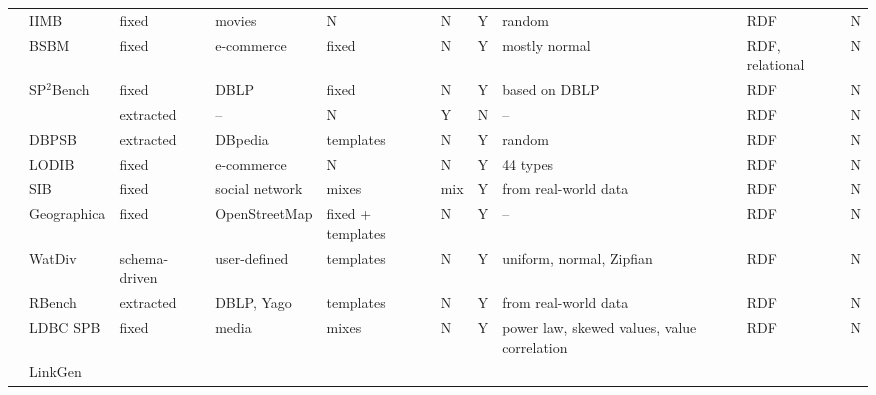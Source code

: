 \begin{sidewaystable}
{\begin{tabular}{| c | p{2.2cm} | l |  p{2.2cm} | l |  l | l | p{3cm} | p{1.4cm} | l | }
\cline{2-10}
 & IIMB & fixed & movies  & N & N & Y & random &  RDF & N   \\  
\cline{2-10}
 & BSBM & fixed & e-commerce  & fixed & N & Y & mostly normal &  RDF, relational & N   \\ 
\cline{2-10}
 & SP$^2$Bench & fixed & DBLP  & fixed & N & Y & based on DBLP  & RDF & N   \\ 
\cline{2-10}
 & \cite{Duan:2011:AOC:1989323.1989340} & extracted & -- & N & Y &N & -- &  RDF & N    \\ 
\cline{2-10}
 & DBPSB & extracted & DBpedia &  templates & N & Y & random &  RDF & N   \\  
\cline{2-10}
 & LODIB & fixed & e-commerce &  N & N & Y & 44 types &  RDF & N   \\ 
\cline{2-10}
 & SIB & fixed & social network &  mixes & mix & Y & from real-world data &  RDF & N   \\ 
\cline{2-10}
 & Geographica & fixed & OpenStreetMap  & fixed + templates  & N & Y & -- &  RDF & N   \\ 
\cline{2-10}
 & WatDiv & schema-driven & user-defined  & templates & N & Y & uniform, normal, Zipfian &  RDF & N   \\  
\cline{2-10}
 & RBench & extracted & DBLP, Yago  & templates & N & Y & from real-world data &  RDF & N  \\  
\cline{2-10}
 & LDBC SPB & fixed & media  & mixes & N & Y & power law, skewed values, value correlation &  RDF & N  \\  
\cline{2-10}
 & LinkGen & & & & & & & & \\
\hline
\end{tabular} }
\label{tab:comparisonCharacteristicsA}
\end{sidewaystable}

